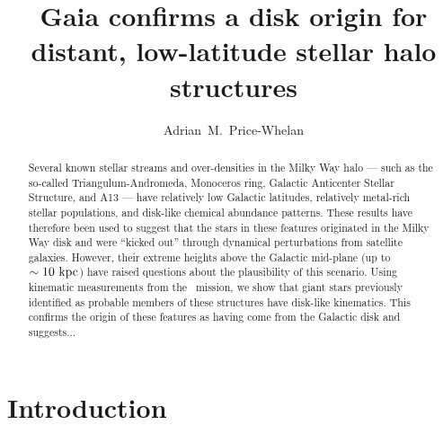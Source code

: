 \documentclass[modern]{aastex62}
\newcommand{\gaia}{\project{Gaia}}
\begin{document}
\sloppy\sloppypar\raggedbottom\frenchspacing %

\title{Gaia confirms a disk origin for distant, low-latitude stellar halo structures}

\author[0000-0003-0872-7098]{Adrian~M.~Price-Whelan}



\begin{abstract}

Several known stellar streams and over-densities in the Milky Way halo --- such
as the so-called Triangulum-Andromeda, Monoceros ring, Galactic Anticenter
Stellar Structure, and A13 --- have relatively low Galactic latitudes,
relatively metal-rich stellar populations, and disk-like chemical abundance
patterns.
These results have therefore been used to suggest that the stars in these
features originated in the Milky Way disk and were ``kicked out'' through
dynamical perturbations from satellite galaxies.
However, their extreme heights above the Galactic mid-plane (up to $\sim
10~\mathrm{kpc}$) have raised questions about the plausibility of this scenario.
Using kinematic measurements from the \gaia\ mission, we show that giant stars
previously identified as probable members of these structures have disk-like
kinematics.
This confirms the origin of these features as having come from the Galactic
disk and suggests...

\end{abstract}


\section{Introduction}
\label{sec:introduction}
\end{document}

